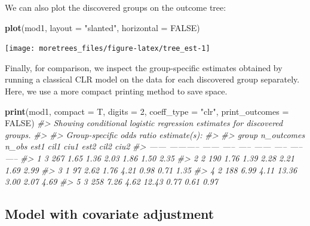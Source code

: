 \documentclass[]{article}
\newenvironment{Shaded}{\begin{snugshade}}{\end{snugshade}}
\newcommand{\CommentTok}[1]{\textcolor[rgb]{0.56,0.35,0.01}{\textit{#1}}}
\newcommand{\DataTypeTok}[1]{\textcolor[rgb]{0.13,0.29,0.53}{#1}}
\newcommand{\DecValTok}[1]{\textcolor[rgb]{0.00,0.00,0.81}{#1}}
\newcommand{\KeywordTok}[1]{\textcolor[rgb]{0.13,0.29,0.53}{\textbf{#1}}}
\newcommand{\NormalTok}[1]{#1}
\newcommand{\OtherTok}[1]{\textcolor[rgb]{0.56,0.35,0.01}{#1}}
\newcommand{\StringTok}[1]{\textcolor[rgb]{0.31,0.60,0.02}{#1}}
\begin{document}
We can also plot the discovered groups on the outcome tree:

\begin{Shaded}
\begin{Highlighting}[]
\KeywordTok{plot}\NormalTok{(mod1, }\DataTypeTok{layout =} \StringTok{"slanted"}\NormalTok{, }\DataTypeTok{horizontal =} \OtherTok{FALSE}\NormalTok{)}
\end{Highlighting}
\end{Shaded}

\begin{center}\texttt{[image: moretrees\_files/figure-latex/tree\_est-1]} \end{center}

Finally, for comparison, we inspect the group-specific estimates
obtained by running a classical CLR model on the data for each
discovered group separately. Here, we use a more compact printing method
to save space.

\begin{Shaded}
\begin{Highlighting}[]
\KeywordTok{print}\NormalTok{(mod1, }\DataTypeTok{compact =}\NormalTok{ T, }\DataTypeTok{digits =} \DecValTok{2}\NormalTok{, }
      \DataTypeTok{coeff_type =} \StringTok{"clr"}\NormalTok{, }\DataTypeTok{print_outcomes =} \OtherTok{FALSE}\NormalTok{)}
\CommentTok{#> Showing conditional logistic regression estimates for discovered groups.}
\CommentTok{#> }
\CommentTok{#> Group-specific odds ratio estimate(s):}
\CommentTok{#> }
\CommentTok{#>  group   n_outcomes   n_obs   est1   cil1    ciu1   est2   cil2   ciu2}
\CommentTok{#> ------  -----------  ------  -----  -----  ------  -----  -----  -----}
\CommentTok{#>      1            3     267   1.65   1.36    2.03   1.86   1.50   2.35}
\CommentTok{#>      2            2     190   1.76   1.39    2.28   2.21   1.69   2.99}
\CommentTok{#>      3            1      97   2.62   1.76    4.21   0.98   0.71   1.35}
\CommentTok{#>      4            2     188   6.99   4.11   13.36   3.00   2.07   4.69}
\CommentTok{#>      5            3     258   7.26   4.62   12.43   0.77   0.61   0.97}
\end{Highlighting}
\end{Shaded}

\hypertarget{model-with-covariate-adjustment}{%
\subsection{Model with covariate
adjustment}\label{model-with-covariate-adjustment}}
\end{document}
